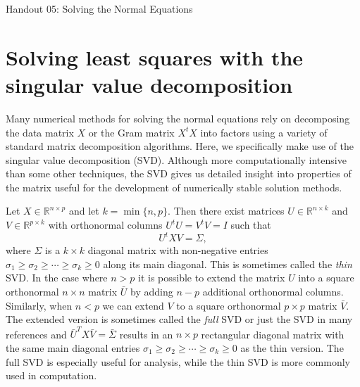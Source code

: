 \documentclass[12pt,hidelinks]{article}
\numberwithin{equation}{section}
\begin{document}
{\LARGE Handout 05: Solving the Normal Equations}

\vspace*{18pt}



\section{Solving least squares with the singular value decomposition} \label{sec_ols_svd}

Many numerical methods for solving the normal equations rely on decomposing the
data matrix $X$ or the Gram matrix $X^t X$ into factors using a variety of
standard matrix decomposition algorithms. Here, we specifically make use
of the singular value decomposition (SVD). Although more computationally
intensive than some other techniques, the SVD gives us detailed insight into
properties of the matrix useful for the development of numerically stable
solution methods.

Let $X\in\mathbb{R}^{n \times p}$ and let $k=\min\{n, p\}$.  Then
there exist matrices $U\in\mathbb{R}^{n \times k}$ and $V\in\mathbb{R}^{p\times
k}$ with orthonormal columns $U^t U = V^t V = I$ such that
\begin{equation}\label{SVD}
U^t X V = \Sigma,
\end{equation}
where $\Sigma$ is a $k\times k$ diagonal matrix with non-negative entries
$\sigma_1 \ge \sigma_2 \ge \cdots \ge \sigma_k \ge 0$ along its
main diagonal. This is sometimes called the \textit{thin} SVD. In the case
where $n > p$ it is possible to extend the matrix $U$
into a square orthonormal $n\times n$ matrix $\bar{U}$
by adding $n - p$ additional orthonormal columns.
Similarly, when $n < p$ we can extend $V$ to a square
orthonormal $p\times p$ matrix $\bar{V}$.
The extended version is
sometimes called the {\it full} SVD or just the SVD in many references and
$\bar{U}^TX\bar{V}=\bar{\Sigma}$ results in an $n\times p$ rectangular diagonal
matrix with the same main diagonal entries $\sigma_1 \ge \sigma_2 \ge \cdots \ge
\sigma_k \ge 0$ as the thin version. The full SVD is especially useful
for analysis, while the thin SVD is more commonly used in computation.
\end{document}
